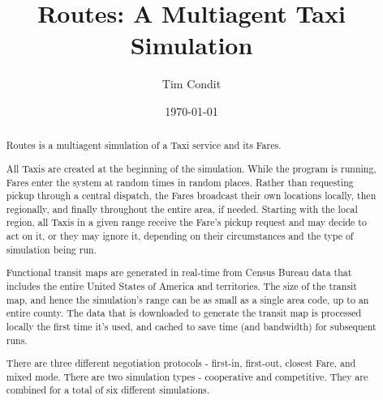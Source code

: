 \documentclass[11pt,letterpaper,onecolumn,twoside,openright,final]{report}
\begin{document}
\title{Routes: A Multiagent Taxi Simulation}
\author{Tim Condit}
\date{\today}
\maketitle
\thispagestyle{empty}


\pagestyle{headings}
\setcounter{page}{1}

\tableofcontents
\listoffigures
\listoftables


\begin{abstract}
Routes is a multiagent simulation of a Taxi service and its Fares.

All Taxis are created at the beginning of the simulation.
While the program is running, Fares enter the system at random times in random places.
Rather than requesting pickup through a central dispatch, the Fares broadcast their own locations locally, then regionally, and finally throughout the entire area, if needed.
Starting with the local region, all Taxis in a given range receive the Fare's pickup request and may decide to act on it, or they may ignore it, depending on their circumstances and the type of simulation being run.

Functional transit maps are generated in real-time from Census Bureau data that includes the entire United States of America and territories.
The size of the transit map, and hence the simulation's range can be as small as a single area code, up to an entire county.
The data that is downloaded to generate the transit map is processed locally the first time it's used, and cached to save time (and bandwidth) for subsequent runs.



There are three different negotiation protocols - first-in, first-out, closest Fare, and mixed mode.
There are two simulation types - cooperative and competitive.
They are combined for a total of six different simulations.
\end{abstract}
\end{document}
